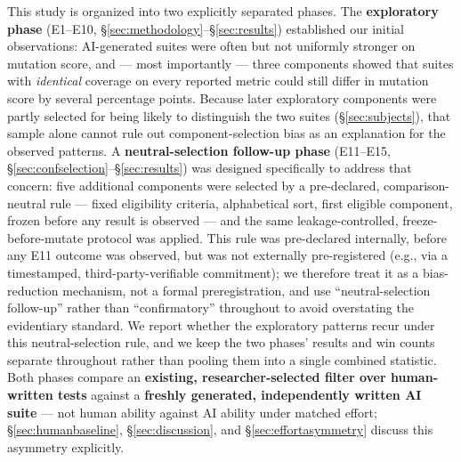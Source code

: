 \documentclass[10pt,conference]{IEEEtran}
\begin{document}
This study is organized into two explicitly separated phases. The \textbf{exploratory phase} (E1--E10, \S\ref{sec:methodology}--\S\ref{sec:results}) established our initial observations: AI-generated suites were often but not uniformly stronger on mutation score, and — most importantly — three components showed that suites with \emph{identical} coverage on every reported metric could still differ in mutation score by several percentage points. Because later exploratory components were partly selected for being likely to distinguish the two suites (\S\ref{sec:subjects}), that sample alone cannot rule out component-selection bias as an explanation for the observed patterns. A \textbf{neutral-selection follow-up phase} (E11--E15, \S\ref{sec:confselection}--\S\ref{sec:results}) was designed specifically to address that concern: five additional components were selected by a pre-declared, comparison-neutral rule — fixed eligibility criteria, alphabetical sort, first eligible component, frozen before any result is observed — and the same leakage-controlled, freeze-before-mutate protocol was applied. This rule was pre-declared internally, before any E11 outcome was observed, but was not externally pre-registered (e.g., via a timestamped, third-party-verifiable commitment); we therefore treat it as a bias-reduction mechanism, not a formal preregistration, and use ``neutral-selection follow-up'' rather than ``confirmatory'' throughout to avoid overstating the evidentiary standard. We report whether the exploratory patterns recur under this neutral-selection rule, and we keep the two phases' results and win counts separate throughout rather than pooling them into a single combined statistic. Both phases compare an \textbf{existing, researcher-selected filter over human-written tests} against a \textbf{freshly generated, independently written AI suite} — not human ability against AI ability under matched effort; \S\ref{sec:humanbaseline}, \S\ref{sec:discussion}, and \S\ref{sec:effortasymmetry} discuss this asymmetry explicitly.
\end{document}
